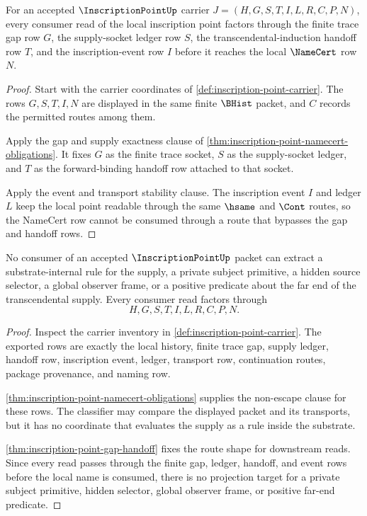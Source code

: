 \begin{theorem}
\label{thm:inscription-point-gap-handoff}
For an accepted $\InscriptionPointUp$ carrier $J=(H,G,S,T,I,L,R,C,P,N)$, every consumer read of the local inscription point factors through the finite trace gap row $G$, the supply-socket ledger row $S$, the transcendental-induction handoff row $T$, and the inscription-event row $I$ before it reaches the local $\NameCert$ row $N$.
\end{theorem}
\begin{proof}
Start with the carrier coordinates of \autoref{def:inscription-point-carrier}. The rows $G,S,T,I,N$ are displayed in the same finite $\BHist$ packet, and $C$ records the permitted routes among them.

Apply the gap and supply exactness clause of \autoref{thm:inscription-point-namecert-obligations}. It fixes $G$ as the finite trace socket, $S$ as the supply-socket ledger, and $T$ as the forward-binding handoff row attached to that socket.

Apply the event and transport stability clause. The inscription event $I$ and ledger $L$ keep the local point readable through the same $\hsame$ and $\Cont$ routes, so the NameCert row cannot be consumed through a route that bypasses the gap and handoff rows.
\end{proof}

\begin{theorem}
\label{thm:inscription-point-non-escape}
No consumer of an accepted $\InscriptionPointUp$ packet can extract a substrate-internal rule for the supply, a private subject primitive, a hidden source selector, a global observer frame, or a positive predicate about the far end of the transcendental supply. Every consumer read factors through
$$
H,G,S,T,I,L,R,C,P,N.
$$
\end{theorem}
\begin{proof}
Inspect the carrier inventory in \autoref{def:inscription-point-carrier}. The exported rows are exactly the local history, finite trace gap, supply ledger, handoff row, inscription event, ledger, transport row, continuation routes, package provenance, and naming row.

\autoref{thm:inscription-point-namecert-obligations} supplies the non-escape clause for these rows. The classifier may compare the displayed packet and its transports, but it has no coordinate that evaluates the supply as a rule inside the substrate.

\autoref{thm:inscription-point-gap-handoff} fixes the route shape for downstream reads. Since every read passes through the finite gap, ledger, handoff, and event rows before the local name is consumed, there is no projection target for a private subject primitive, hidden selector, global observer frame, or positive far-end predicate.
\end{proof}

